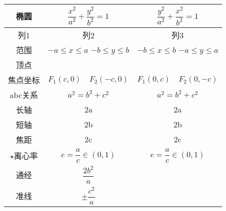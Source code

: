 \documentclass[lang=cn,10pt]{elegantbook}
\begin{document}
\begin{longtable}{|c|c|c|}
	\hline
	椭圆 & $\dfrac{x^{2}}{a^{2}}+\dfrac{y^{2}}{b^{2}}=1$ & $\dfrac{y^{2}}{a^{2}}+\dfrac{x^{2}}{b^{2}}=1$ \\
	\hline
	\endfirsthead
	
	\hline
	列1 & 列2 & 列3 \\
	\hline
	\endhead
	
	\hline
	\endfoot
	
	\hline
	\endlastfoot
	
	范围 & $-a\leq x \leq a$  \quad  $ -b\leq y \leq b$ & $-b\leq x \leq b$  \quad  $ -a\leq y \leq a$ \\
	\hline
	顶点 &   &    \\
	\hline
	焦点坐标 & $F_{1}(c,0) \quad F_{2}(-c,0)$ & $F_{1}(0,c) \quad F_{2}(0,-c)$ \\
	\hline
	abc关系 & $a^{2}=b^{2}+c^{2}$ & $a^{2}=b^{2}+c^{2}$ \\
	\hline
	长轴 & 2a  & 2a\\
	\hline
	短轴 & 2b   & 2b \\
	\hline
	焦距 & 2c  & 2c \\
	\hline
		$\star$离心率 & $e=\dfrac{a}{c} \in(0,1)$ &  $e=\dfrac{a}{c}\in(0,1)$ \\
	\hline
		通经 & $\dfrac{2b^{2}}{a}$ &  \\
	\hline
	准线 & $\pm \dfrac{c^{2}}{a}$ &  \\
	\hline
\end{longtable}
\end{document}
